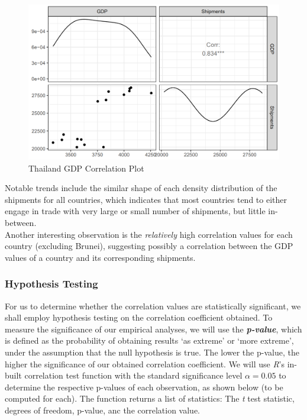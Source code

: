 \documentclass{article}
\begin{document}
\begin{figure}[H]
    \centering
    \includegraphics[width=1\textwidth]{images/Line Plots/Thailand/Thailand_Corrplot.png}
    \caption{Thailand GDP Correlation Plot}
    \label{fig:my_label}
\end{figure}

\noindent Notable trends include the similar shape of each density distribution of the shipments for all countries, which indicates that most countries tend to either engage in trade with very large or small number of shipments, but little in-between. \\

\noindent Another interesting observation is the \textit{relatively} high correlation values for each country (excluding Brunei), suggesting possibly a correlation between the GDP values of a country and its corresponding shipments. 

\subsubsection{Hypothesis Testing}
For us to determine whether the correlation values are statistically significant, we shall employ hypothesis testing on the correlation coefficient obtained. To measure the significance of our empirical analyses, we will use the \textbf{\textit{p-value}}, which is defined as the probability of obtaining results ‘as extreme’ or ‘more extreme’, under the assumption that the null hypothesis is true. The lower the p-value, the higher the significance of our obtained correlation coefficient. We will use \textit{R}'s in-built correlation test function with the standard significance level $\alpha = 0.05$ to determine the respective p-values of each observation, as shown below (to be computed for each). The function returns a list of statistics: The \textit{t} test statistic, degrees of freedom, p-value, anc the correlation value. \\
\end{document}

